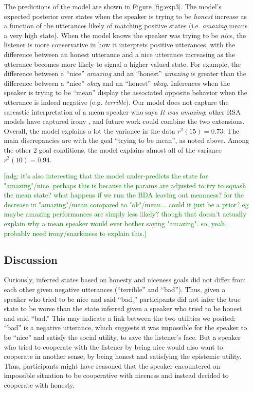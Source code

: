 \documentclass[10pt,letterpaper]{article}
\newcommand{\ndg}[1]{\textcolor{Green}{[ndg: #1]}}
\newcommand{\mht}[1]{\textcolor{DarkOrange}{[mht: #1]}}
\begin{document}
The predictions of the model are shown in Figure \ref{fig:exp3}.
The model's expected posterior over states when the speaker is trying to be \emph{honest} increase as a function of the utterances likely of matching positive states (i.e. \emph{amazing} means a very high state).
When the model knows the speaker was trying to be \emph{nice}, the listener is more conservative in how it interprets positive utterances, with the difference between an honest utterance and a nice utterance increasing as the utterance becomes more likely to signal a higher valued state. 
For example, the difference between a ``nice'' \emph{amazing} and an ``honest'' \emph{amazing} is greater than the difference between a ``nice'' \emph{okay} and an ``honest'' \emph{okay}.
Inferences when the speaker is trying to be ``mean'' display the associated opposite behavior when the utterance is indeed negative (e.g. \emph{terrible}).
Our model does not capture the sarcastic interpretation of a mean speaker who says \emph{It was amazing}; other RSA models have captured irony \cite{Kao2015}, and future work could combine the two extensions. %
Overall, the model explains a lot the variance in the data $r^2(15) = 0.73$. 
The main discrepancies are with the goal ``trying to be mean'', as noted above. 
Among the other 2 goal conditions, the model explains almost all of the variance $r^2(10) = 0.94$. 

\ndg{it's also interesting that the model under-predicts the state for "amazing"/nice. perhaps this is because the params are adjusted to try to squash the mean state? what happens if we run the BDA leaving out meanness?
for the decrease in "amazing"/mean compared to "ok"/mean... could it just be a prior? eg maybe amazing performances are simply less likely? though that doesn't actually explain why a mean speaker would ever bother saying "amazing". so, yeah, probably need irony/snarkiness to explain this.}

\subsection{Discussion}

Curiously, inferred states based on honesty and niceness goals did not differ from each other given negative utterances (``terrible'' and ``bad''). Thus, given a speaker who tried to be nice and said ``bad,'' participants did not infer the true state to be worse than the state inferred given a speaker who tried to be honest and said ``bad.'' This may indicate a link between the two utilities we posited: ``bad'' is a negative utterance, which suggests it was impossible for the speaker to be ``nice'' and satisfy the social utility, to save the listener's face. But a speaker who tried to cooperate with the listener by being nice would also want to cooperate in another sense, by being honest and satisfying the epistemic utility.  Thus, participants might have reasoned that the speaker encountered an impossible situation to be cooperative with niceness and instead decided to cooperate with honesty. 
\end{document}
